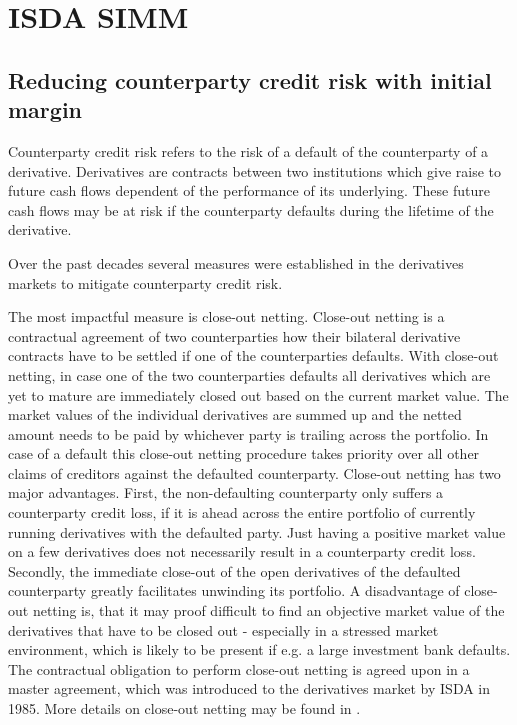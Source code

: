 \documentclass[../Thesis_AHoecherl.tex]{subfiles}
\begin{document}
    \section{ISDA SIMM}\label{ISDA SIMM}

    \subsection{Reducing counterparty credit risk with initial margin}

    Counterparty credit risk refers to the risk of a default of the counterparty of a derivative. Derivatives are contracts between two institutions which give raise to future cash flows dependent of the performance of its underlying. These future cash flows may be at risk if the counterparty defaults during the lifetime of the derivative. 
    
    Over the past decades several measures were established in the derivatives markets to mitigate counterparty credit risk.
    
    The most impactful measure is close-out netting. Close-out netting is a contractual agreement of two counterparties how their bilateral derivative contracts have to be settled if one of the counterparties defaults. With close-out netting, in case one of the two counterparties defaults all derivatives which are yet to mature are immediately closed out based on the current market value. The market values of the individual derivatives are summed up and the netted amount needs to be paid by whichever party is trailing across the portfolio. In case of a default this close-out netting procedure takes priority over all other claims of creditors against the defaulted counterparty. Close-out netting has two major advantages. First, the non-defaulting counterparty only suffers a counterparty credit loss, if it is ahead across the entire portfolio of currently running derivatives with the defaulted party. Just having a positive market value on a few derivatives does not necessarily result in a counterparty credit loss. Secondly, the immediate close-out of the open derivatives of the defaulted counterparty greatly facilitates unwinding its portfolio. A disadvantage of close-out netting is, that it may proof difficult to find an objective market value of the derivatives that have to be closed out - especially in a stressed market environment, which is likely to be present if e.g. a large investment bank defaults. The contractual obligation to perform close-out netting is agreed upon in a master agreement, which was introduced to the derivatives market by ISDA in 1985. More details on close-out netting may be found in \cite[Chapter~5]{gregory2015xva}.
    
\end{document}
